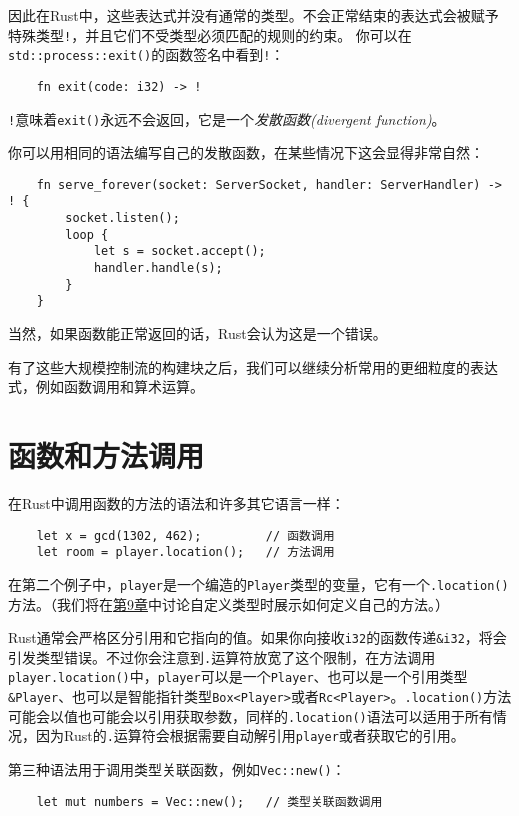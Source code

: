 因此在Rust中，这些表达式并没有通常的类型。不会正常结束的表达式会被赋予特殊类型\texttt{!}，并且它们不受类型必须匹配的规则的约束。 你可以在\texttt{std::process::exit()}的函数签名中看到\texttt{!}：
\begin{verbatim}
    fn exit(code: i32) -> !
\end{verbatim}

\texttt{!}意味着\texttt{exit()}永远不会返回，它是一个\emph{发散函数(divergent function)}。

你可以用相同的语法编写自己的发散函数，在某些情况下这会显得非常自然：
\begin{verbatim}
    fn serve_forever(socket: ServerSocket, handler: ServerHandler) -> ! {
        socket.listen();
        loop {
            let s = socket.accept();
            handler.handle(s);
        }
    }
\end{verbatim}

当然，如果函数能正常返回的话，Rust会认为这是一个错误。

有了这些大规模控制流的构建块之后，我们可以继续分析常用的更细粒度的表达式，例如函数调用和算术运算。

\section{函数和方法调用}

在Rust中调用函数的方法的语法和许多其它语言一样：
\begin{verbatim}
    let x = gcd(1302, 462);         // 函数调用
    let room = player.location();   // 方法调用
\end{verbatim}

在第二个例子中，\texttt{player}是一个编造的\texttt{Player}类型的变量，它有一个\texttt{.location()}方法。（我们将在\hyperref[ch09]{第9章}中讨论自定义类型时展示如何定义自己的方法。）

Rust通常会严格区分引用和它指向的值。如果你向接收\texttt{i32}的函数传递\texttt{\&i32}，将会引发类型错误。不过你会注意到\texttt{.}运算符放宽了这个限制，在方法调用\texttt{player.location()}中，\texttt{player}可以是一个\texttt{Player}、也可以是一个引用类型\texttt{\&Player}、也可以是智能指针类型\texttt{Box<Player>}或者\texttt{Rc<Player>}。\texttt{.location()}方法可能会以值也可能会以引用获取参数，同样的\texttt{.location()}语法可以适用于所有情况，因为Rust的\texttt{.}运算符会根据需要自动解引用\texttt{player}或者获取它的引用。

第三种语法用于调用类型关联函数，例如\texttt{Vec::new()}：
\begin{verbatim}
    let mut numbers = Vec::new();   // 类型关联函数调用
\end{verbatim}

